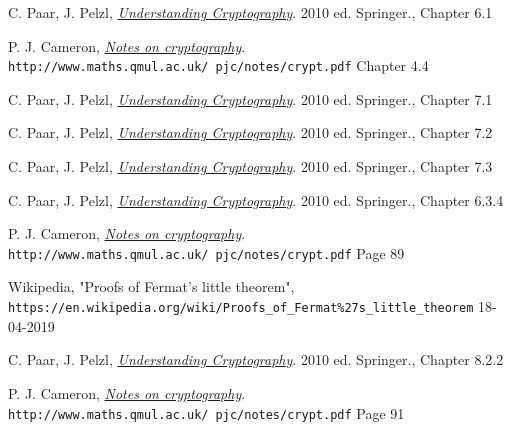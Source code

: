 \documentclass{article}
\begin{document}
	\begin{thebibliography}{99}
		
		C. Paar, J. Pelzl, 
		\textit{\underline{Understanding Cryptography}}. 2010 ed.
		Springer., Chapter 6.1 
		
		P. J. Cameron, 
		\textit{\underline{Notes on cryptography}}.
		\\\texttt{http://www.maths.qmul.ac.uk/~pjc/notes/crypt.pdf}
		Chapter 4.4 
		
		C. Paar, J. Pelzl, 
		\textit{\underline{Understanding Cryptography}}. 2010 ed.
		Springer., Chapter 7.1 
		
		C. Paar, J. Pelzl, 
		\textit{\underline{Understanding Cryptography}}. 2010 ed.
		Springer., Chapter 7.2
		
		C. Paar, J. Pelzl, 
		\textit{\underline{Understanding Cryptography}}. 2010 ed.
		Springer., Chapter 7.3 
		
		C. Paar, J. Pelzl, 
		\textit{\underline{Understanding Cryptography}}. 2010 ed.
		Springer., Chapter 6.3.4 
		
		P. J. Cameron, 
		\textit{\underline{Notes on cryptography}}.
		\\\texttt{http://www.maths.qmul.ac.uk/~pjc/notes/crypt.pdf}
		Page 89  
		
		Wikipedia, "Proofs of Fermat's little theorem",
		\\\texttt{https://en.wikipedia.org/wiki/Proofs\_of\_Fermat\%27s\_little\_theorem} 18-04-2019
		
		C. Paar, J. Pelzl, 
		\textit{\underline{Understanding Cryptography}}. 2010 ed.
		Springer., Chapter 8.2.2 
		
		P. J. Cameron, 
		\textit{\underline{Notes on cryptography}}.
		\\\texttt{http://www.maths.qmul.ac.uk/~pjc/notes/crypt.pdf}
		Page 91
		
	\end{thebibliography}
\end{document}
